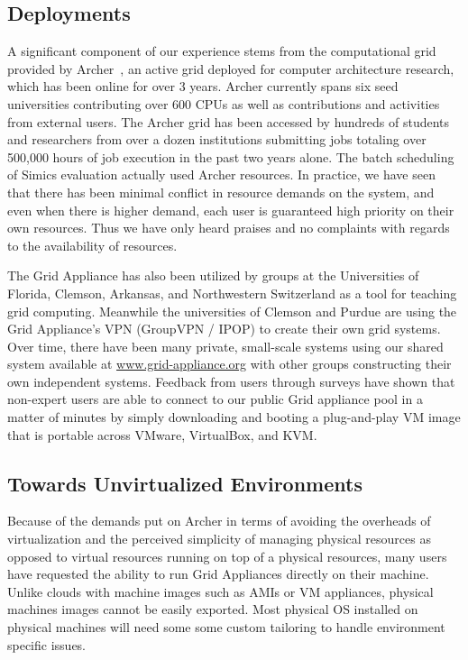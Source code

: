\documentclass[twocolumn]{svjour3}
\begin{document}
\subsection{Deployments}

A significant component of our experience stems from the computational grid
provided by Archer~\cite{archer}, an active grid deployed for computer
architecture research, which has been online for over 3 years.  Archer
currently spans six seed universities contributing over 600 CPUs as well as
contributions and activities from external users.  The Archer grid has been
accessed by hundreds of students and researchers from over a dozen institutions
submitting jobs totaling over 500,000 hours of job execution in the past two
years alone.  The batch scheduling of Simics evaluation actually used Archer
resources.  In practice, we have seen that there has been minimal conflict in
resource demands on the system, and even when there is higher demand, each user
is guaranteed high priority on their own resources.  Thus we have only heard
praises and no complaints with regards to the availability of resources.

The Grid Appliance has also been utilized by groups at the Universities of
Florida, Clemson, Arkansas, and Northwestern Switzerland as a tool for teaching
grid computing.  Meanwhile the universities of Clemson and Purdue are using the
Grid Appliance's VPN (GroupVPN / IPOP) to create their own grid systems.  Over
time, there have been many private, small-scale systems using our shared system
available at \url{www.grid-appliance.org} with other groups constructing their
own independent systems.  Feedback from users through surveys have shown that
non-expert users are able to connect to our public Grid appliance pool in a
matter of minutes by simply downloading and booting a plug-and-play VM image
that is portable across VMware, VirtualBox, and KVM.

\subsection{Towards Unvirtualized Environments}
\label{packaging}

Because of the demands put on Archer in terms of avoiding the overheads of
virtualization and the perceived simplicity of managing physical resources as
opposed to virtual resources running on top of a physical resources, many users
have requested the ability to run Grid Appliances directly on their machine.
Unlike clouds with machine images such as AMIs or VM appliances, physical
machines images cannot be easily exported.  Most physical OS installed on
physical machines will need some some custom tailoring to handle environment
specific issues.
\end{document}
